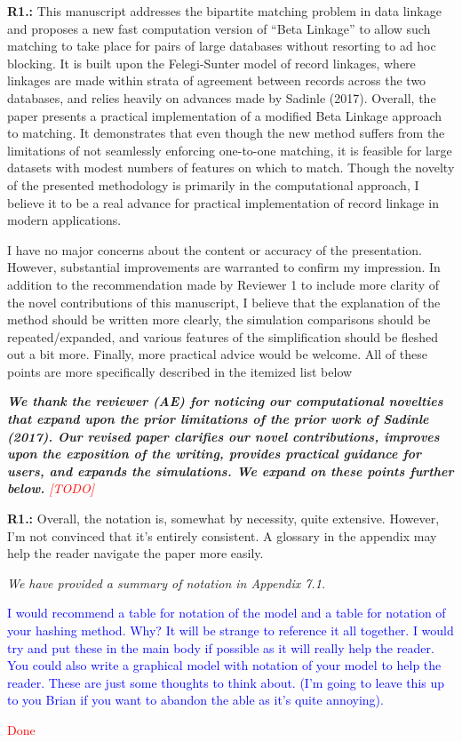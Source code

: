 \documentclass[letterpaper, parskip]{scrartcl}
\newcommand{\pointRaised}[2]{%
	\textbf{#1.\theresponsectr:} #2
}
\newcounter{responsectr}[section]     %
\newcommand{\reply}[1]{%
	\refstepcounter{responsectr}%
		\begin{tcolorbox}
			\itshape #1
		\end{tcolorbox}
}
\newcommand{\todo}{\textcolor{red}{[TODO]}\xspace}
\begin{document}


	\setcounter{responsectr}{0}

	\pointRaised{R1}{%
	This manuscript addresses the bipartite matching problem in data linkage and proposes a new fast computation version of “Beta Linkage” to allow such matching to take place for pairs of large databases without resorting to ad hoc blocking. It is built upon the Felegi-Sunter model of record linkages, where linkages are made within strata of agreement between records across the two databases, and relies heavily on advances made by Sadinle (2017). Overall, the paper presents a practical implementation of a modified Beta Linkage approach to	matching. It demonstrates that even though the new method suffers from the limitations of not seamlessly enforcing one-to-one matching, it is feasible for large datasets with modest numbers of features on which to match. Though the novelty of the presented methodology is primarily in the computational approach, I believe it to be a real advance for practical implementation of record linkage in modern applications.
	
	I have no major concerns about the content or accuracy of the presentation. However, substantial improvements are warranted to confirm my impression. In addition to the recommendation made by Reviewer 1 to include more clarity of the novel contributions of this manuscript, I believe that the explanation of the method should be written more clearly, the simulation comparisons should be repeated/expanded, and various features of the simplification should be fleshed out a bit more. Finally, more practical advice would be welcome. All of these points are more specifically described in the itemized list below
	}

	\reply{%
	\textbf{We thank the reviewer (AE) for noticing our computational novelties that expand upon the prior limitations of the prior work of Sadinle (2017). Our revised paper clarifies our novel contributions, improves upon the exposition of the writing, provides practical guidance for users, and expands the simulations. We expand on these points further below.} \todo
	}

	\pointRaised{R1}{%
		Overall, the notation is, somewhat by necessity, quite extensive. However, I’m not convinced that it’s entirely consistent. A glossary in the appendix may help the reader navigate the paper more easily.}
\reply{%
	We have provided a summary of notation in Appendix 7.1. 
	
	\textcolor{blue}{I would recommend a table for notation of the model and a table for notation of your hashing method. Why? It will be strange to reference it all together. I would try and put these in the main body if possible as it will really help the reader. You could also write a graphical model with notation of your model to help the reader. These are just some thoughts to think about. (I'm going to leave this up to you Brian if you want to abandon the able as it's quite annoying).}

	\textcolor{red}{Done}
}
\end{document}
